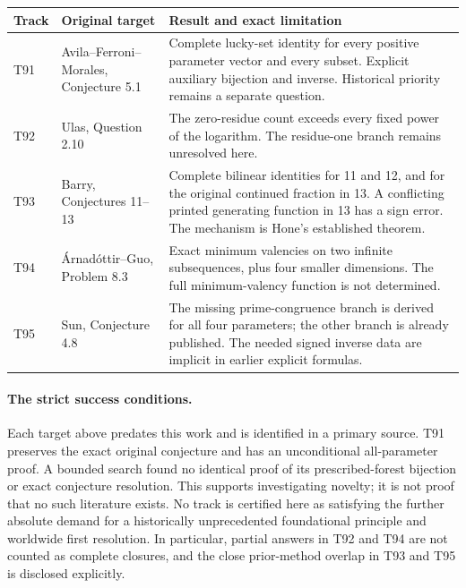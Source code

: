 \documentclass[11pt,a4paper]{article}
\theoremstyle{definition}
\theoremstyle{remark}
\begin{document}
\begin{center}
\small
\renewcommand{\arraystretch}{1.22}
\begin{tabular}{@{}>{\raggedright\arraybackslash}p{}>{\raggedright\arraybackslash}p{}>{\raggedright\arraybackslash}p{}@{}}
\toprule
Track & Original target & Result and exact limitation\\
\midrule
T91 & Avila--Ferroni--Morales, Conjecture 5.1 & Complete lucky-set identity for every positive parameter vector and every subset. Explicit auxiliary bijection and inverse. Historical priority remains a separate question.\\
T92 & Ulas, Question 2.10 & The zero-residue count exceeds every fixed power of the logarithm. The residue-one branch remains unresolved here.\\
T93 & Barry, Conjectures 11--13 & Complete bilinear identities for 11 and 12, and for the original continued fraction in 13. A conflicting printed generating function in 13 has a sign error. The mechanism is Hone's established theorem.\\
T94 & \'{A}rnad\'ottir--Guo, Problem 8.3 & Exact minimum valencies on two infinite subsequences, plus four smaller dimensions. The full minimum-valency function is not determined.\\
T95 & Sun, Conjecture 4.8 & The missing prime-congruence branch is derived for all four parameters; the other branch is already published. The needed signed inverse data are implicit in earlier explicit formulas.\\
\bottomrule
\end{tabular}
\end{center}

\paragraph{The strict success conditions.}
Each target above predates this work and is identified in a primary source.
T91 preserves the exact original conjecture and has an unconditional
all-parameter proof. A bounded search found no identical proof of its
prescribed-forest bijection or exact conjecture resolution. This supports
investigating novelty; it is not proof that no such literature exists.
No track is certified here as satisfying the further absolute demand for
a historically unprecedented foundational principle and worldwide first
resolution. In particular, partial answers in T92 and T94 are not counted
as complete closures, and the close prior-method overlap in T93 and T95
is disclosed explicitly.
\end{document}

